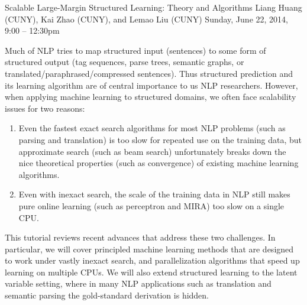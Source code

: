 \begin{tutorial}{Scalable Large-Margin Structured Learning: Theory and Algorithms}
  {Liang Huang (CUNY), Kai Zhao (CUNY), and Lemao Liu (CUNY)}
  {Sunday, June 22, 2014, 9:00 -- 12:30pm}
  {\TutLocB}

Much of NLP tries to map structured input (sentences) to some form of
structured output (tag sequences, parse trees, semantic graphs, or
translated/paraphrased/compressed sentences). Thus structured
prediction and its learning algorithm are of central importance to us
NLP researchers. However, when applying machine learning to structured
domains, we often face scalability issues for two reasons:

\begin{enumerate}
\item Even the fastest exact search algorithms for most NLP problems
(such as parsing and translation) is too slow for repeated use on the
training data, but approximate search (such as beam search)
unfortunately breaks down the nice theoretical properties (such as
convergence) of existing machine learning algorithms.

\item Even with inexact search, the scale of the training data in NLP
still makes pure online learning (such as perceptron and MIRA) too
slow on a single CPU.
\end{enumerate}

This tutorial reviews recent advances that address these two
challenges. In particular, we will cover principled machine learning
methods that are designed to work under vastly inexact search, and
parallelization algorithms that speed up learning on multiple CPUs. We
will also extend structured learning to the latent variable setting,
where in many NLP applications such as translation and semantic
parsing the gold-standard derivation is hidden.

\end{tutorial}
